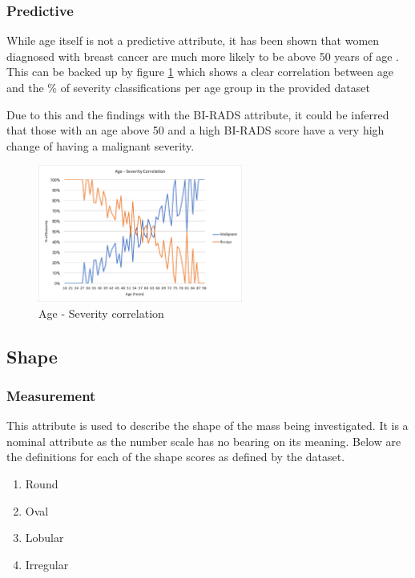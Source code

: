 \documentclass[12pt]{article}
\begin{document}
      \subsubsection{Predictive}
        While age itself is not a predictive attribute, it has been shown that women diagnosed with breast cancer are much more likely to be above 50 years of age \citep{kerlikowske1993mammography}. This can be backed up by figure \ref{fig:age-severity-correlation} which shows a clear correlation between age and the \% of severity classifications per age group in the provided dataset

        Due to this and the findings with the BI-RADS attribute, it could be inferred that those with an age above 50 and a high BI-RADS score have a very high change of having a malignant severity.

        \begin{figure}[H]
          \centering
          \includegraphics[width=0.6\textwidth]{age-severity-correlation}
          \caption{Age - Severity correlation}
          \label{fig:age-severity-correlation}
        \end{figure}


    \subsection{Shape}
      \subsubsection{Measurement}
        This attribute is used to describe the shape of the mass being investigated. It is a nominal attribute as the number scale has no bearing on its meaning. Below are the definitions for each of the shape scores as defined by the dataset.

        \singlespacing
        \begin{enumerate}[label=\arabic*)]
          \item Round
          \item Oval
          \item Lobular
          \item Irregular
        \end{enumerate}
        \doublespacing
\end{document}
